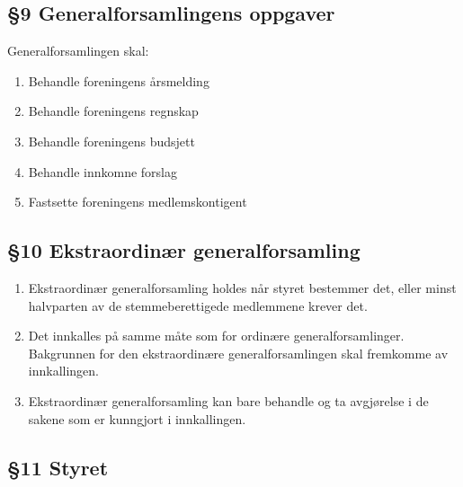 \documentclass[a4paper,11pt,titlepage]{article}
\begin{document}
\subsection*{§9 Generalforsamlingens oppgaver}
Generalforsamlingen skal:

\begin{enumerate}

\item Behandle foreningens årsmelding
\item Behandle foreningens regnskap
\item Behandle foreningens budsjett
\item Behandle innkomne forslag
\item Fastsette foreningens medlemskontigent

\end{enumerate}

\subsection*{§10 Ekstraordinær generalforsamling}

\begin{enumerate}

\item Ekstraordinær generalforsamling holdes når styret bestemmer det, eller minst halvparten av de stemmeberettigede medlemmene krever det.

\item Det innkalles på samme måte som for ordinære generalforsamlinger. Bakgrunnen for den ekstraordinære generalforsamlingen skal fremkomme av innkallingen.

\item Ekstraordinær generalforsamling kan bare behandle og ta avgjørelse i de sakene som er kunngjort i innkallingen.

\end{enumerate}

\subsection*{§11 Styret}
\end{document}
